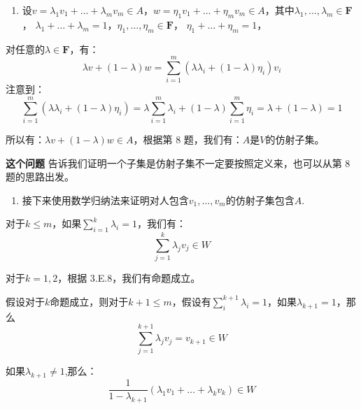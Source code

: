 \documentclass[10pt,a4paper,UTF8]{article}
\begin{document}
\begin{answer}
\begin{enumerate}
\item 设\(v = \lambda_{1}v_{1} + \ldots + \lambda_{m}v_{m} \in A\)，\(w = \eta_{1}v_{1} + \ldots + \eta_{m}v_{m} \in A\)，其中\(\lambda_{1} ,\ldots ,\lambda_{m}\in \mathbf{F}\)， \(\lambda_{1} + \ldots + \lambda_{m} = 1\)，\(\eta_{1} ,\ldots ,\eta_{m}\in \mathbf{F}\)， \(\eta_{1} + \ldots + \eta_{m} = 1\)，
\end{enumerate}

对任意的\(\lambda \in \mathbf{F}\)，有：
\begin{equation}
\label{eq:5}
\lambda v + (1-\lambda)w = \sum_{i=1}^{m}(\lambda\lambda_{i} + (1-\lambda)\eta_{i})v_{i}
\end{equation}
注意到：
\begin{equation}
\label{eq:6}
\sum_{i=1}^{m}(\lambda\lambda_{i} + (1-\lambda)\eta_{i}) = \lambda \sum_{i=1}^{m}\lambda_{i} + (1-\lambda) \sum_{i=1}^{m}\eta_{i} = \lambda + (1-\lambda) = 1
\end{equation}

所以有：\(\lambda v + (1-\lambda)w \in A\)，根据第 8 题，我们有：\(A\)是\(V\)的仿射子集。

\textbf{这个问题} 告诉我们证明一个子集是仿射子集不一定要按照定义来，也可以从第 8 题的思路出发。

\begin{enumerate}
\item 接下来使用数学归纳法来证明对人包含\(v_{1},\ldots ,v_{m}\)的仿射子集包含\(A\).
\end{enumerate}

对于\(k\leq m\)，如果\(\sum_{i=1}^{k}\lambda_{i} = 1\)，我们有：
\begin{equation}
\label{eq:7}
\sum_{j=1}^{k}\lambda_{j}v_{j} \in W
\end{equation}

对于\(k=1,2\)，根据 3.E.8，我们有命题成立。

假设对于\(k\)命题成立，则对于\(k+1\leq m\)，假设有\(\sum_{i}^{k+1}\lambda_{i} = 1\)，如果\(\lambda_{k+1} = 1\)，那么
\begin{equation}
\label{eq:8}
\sum_{j=1}^{k+1}\lambda_{j}v_{j} = v_{k+1} \in W
\end{equation}

如果\(\lambda_{k+1} \neq 1\),那么：
\begin{equation}
\label{eq:9}
\frac{1}{1-\lambda_{k+1}}(\lambda_{1}v_{1} + \ldots + \lambda_{k}v_{k}) \in W
\end{equation}


\end{answer}
\end{document}

